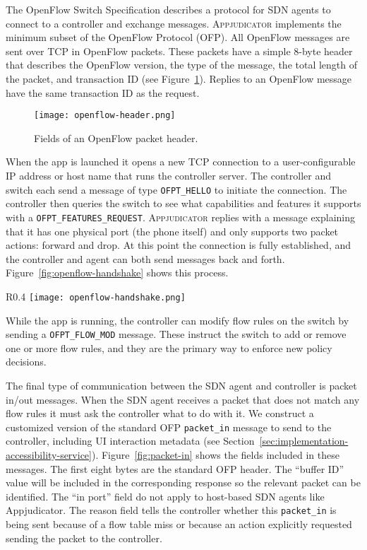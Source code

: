 The OpenFlow Switch Specification describes a protocol for SDN agents to connect
to a controller and exchange messages. \textsc{Appjudicator} implements the
minimum subset of the OpenFlow Protocol (OFP). All OpenFlow messages are sent
over TCP in OpenFlow packets. These packets have a simple 8-byte header that
describes the OpenFlow version, the type of the message, the total length of the
packet, and transaction ID (see Figure~\ref{fig:openflow-header}). Replies to an
OpenFlow message have the same transaction ID as the request.

\begin{figure}[h]
    \centering
    \texttt{[image: openflow-header.png]}
    \caption{Fields of an OpenFlow packet header.}
    \label{fig:openflow-header}
\end{figure}

When the app is launched it opens a new TCP connection to a user-configurable IP
address or host name that runs the controller server. The controller and switch
each send a message of type \texttt{OFPT\_HELLO} to initiate the connection. The
controller then queries the switch to see what capabilities and features it
supports with a \texttt{OFPT\_FEATURES\_REQUEST}. \textsc{Appjudicator} replies
with a message explaining that it has one physical port (the phone itself) and
only supports two packet actions: forward and drop. At this point the connection
is fully established, and the controller and agent can both send messages back
and forth. Figure~\ref{fig:openflow-handshake} shows this process.

\begin{wrapfigure}{R}{0.4\textwidth}
	\centering
	\texttt{[image: openflow-handshake.png]}
    \caption{OpenFlow handshake diagram.}
    \label{fig:openflow-handshake}
\end{wrapfigure}

While the app is running, the controller can modify flow rules on the
switch by sending a \texttt{OFPT\_FLOW\_MOD} message. These instruct the switch
to add or remove one or more flow rules, and they are the primary way to enforce
new policy decisions.

The final type of communication between the SDN agent and controller is packet
in/out messages. When the SDN agent receives a packet that does not match any
flow rules it must ask the controller what to do with it. We construct a
customized version of the standard OFP \texttt{packet\_in} message to send to
the controller, including UI interaction metadata (see
Section~\ref{sec:implementation-accessibility-service}).
Figure~\ref{fig:packet-in} shows the fields included in these messages. The
first eight bytes are the standard OFP header. The ``buffer ID'' value will be
included in the corresponding response so the relevant packet can be identified.
The ``in port'' field do not apply to host-based SDN agents like Appjudicator.
The reason field tells the controller whether this \texttt{packet\_in} is being
sent because of a flow table miss or because an action explicitly requested
sending the packet to the controller.

